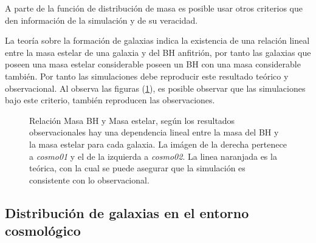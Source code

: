 A parte de la función de distribución de masa es posible usar otros criterios que den información de la simulación y de su veracidad. 

La teoría sobre la formación de galaxias indica la existencia de una relación lineal entre la masa estelar de una galaxia y del BH anfitrión, por tanto las galaxias que poseen una masa estelar considerable poseen un BH con una masa considerable también. Por tanto las simulaciones debe reproducir este resultado teórico y observacional. Al observa las figuras (\ref{fig: Mass_bhVsMass_stelar}), es posible observar que las simulaciones bajo este criterio, también reproducen las observaciones. 
%
 \begin{figure}[-h]
 \centering
 \caption{Relación Masa BH y Masa estelar, según los resultados observacionales hay una dependencia lineal entre la masa del BH y la masa estelar para cada galaxia. La imágen de la derecha pertenece a {\it{cosmo01}} y el de la izquierda a {\it{cosmo02}}. La linea naranjada es la teórica\cite{McConnell2013}, con la cual se puede asegurar que la simulación es consistente con lo observacional.}
 \label{fig: Mass_bhVsMass_stelar}
\end{figure}
%
\subsection{ Distribución de galaxias en el entorno cosmológico}
\label{subsec: Distribucion de galaxias}

